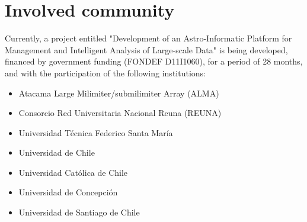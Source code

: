 %
%
%
%
%
%
%
%
%
%
%
%

\section{Involved community}

Currently, a project entitled "Development of an Astro-Informatic Platform
for Management and Intelligent Analysis of Large-scale Data" is being developed,
financed by government funding (FONDEF D11I1060), for a period of 28 months,
and with the participation of the following institutions:

\begin{itemize}
	\item Atacama Large Milimiter/submilimiter Array (ALMA)
	\item Consorcio Red Universitaria Nacional Reuna (REUNA)
	\item Universidad Técnica Federico Santa María
	\item Universidad de Chile
	\item Universidad Católica de Chile
	\item Universidad de Concepción
	\item Universidad de Santiago de Chile
\end{itemize}


